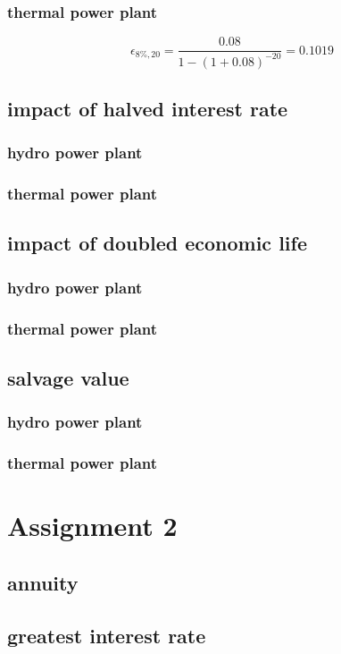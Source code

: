 \documentclass{article}
\begin{document}
\subsubsection{thermal power plant}
$$\epsilon_{8\%,20}=\frac{0.08}{1-(1+0.08)^{-20}}=0.1019$$
\subsection{impact of halved interest rate}
\subsubsection{hydro power plant}
\subsubsection{thermal power plant}
\subsection{impact of doubled economic life}
\subsubsection{hydro power plant}
\subsubsection{thermal power plant}
\subsection{salvage value}
\subsubsection{hydro power plant}
\subsubsection{thermal power plant}
\section{Assignment 2}
\subsection{annuity}
\subsection{greatest interest rate}
\end{document}
